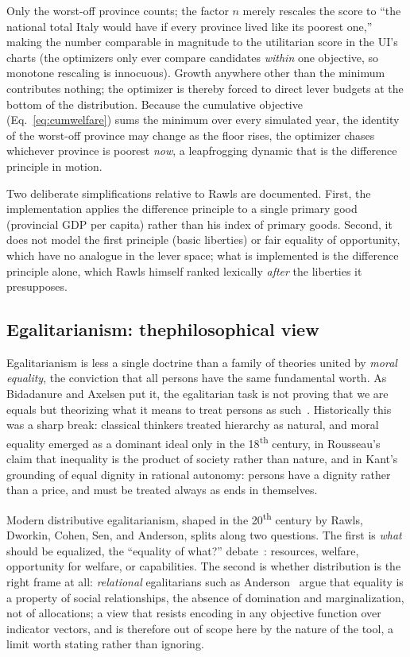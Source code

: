\documentclass[11pt,a4paper]{article}
\begin{document}
Only the worst-off province counts; the factor $n$ merely rescales the score to
``the national total Italy would have if every province lived like its poorest
one,'' making the number comparable in magnitude to the utilitarian score in
the UI's charts (the optimizers only ever compare candidates \emph{within} one
objective, so monotone rescaling is innocuous). Growth anywhere other than the
minimum contributes nothing; the optimizer is thereby forced to direct lever
budgets at the bottom of the distribution. Because the cumulative objective
(Eq.~\ref{eq:cumwelfare}) sums the minimum over every simulated year, the
identity of the worst-off province may change as the floor rises, the
optimizer chases whichever province is poorest \emph{now}, a leapfrogging
dynamic that is the difference principle in motion.

Two deliberate simplifications relative to Rawls are documented. First, the
implementation applies the difference principle to a single primary good
(provincial GDP per capita) rather than his index of primary goods. Second, it
does not model the first principle (basic liberties) or fair equality of
opportunity, which have no analogue in the lever space; what is implemented is
the difference principle alone, which Rawls himself ranked
lexically \emph{after} the liberties it presupposes.

\subsection{Egalitarianism: thephilosophical view}

Egalitarianism is less a single doctrine than a family of theories united by
\emph{moral equality}, the conviction that all persons have the same
fundamental worth. As Bidadanure and Axelsen put it, the egalitarian task is
not proving that we are equals but theorizing what it means to treat persons
as such~\cite{bidadanure2025}. Historically this was a sharp break: classical
thinkers treated hierarchy as natural, and moral equality emerged as a
dominant ideal only in the 18\textsuperscript{th} century, in Rousseau's
claim that inequality is the product of society rather than nature, and in
Kant's grounding of equal dignity in rational autonomy: persons have a dignity
rather than a price, and must be treated always as ends in themselves.

Modern distributive egalitarianism, shaped in the 20\textsuperscript{th}
century by Rawls, Dworkin, Cohen, Sen, and Anderson, splits along two
questions. The first is \emph{what} should be equalized, the ``equality of
what?'' debate~\cite{sen1980}: resources, welfare, opportunity for welfare, or
capabilities. The second is whether distribution is the right frame at all:
\emph{relational} egalitarians such as Anderson~\cite{anderson1999} argue that
equality is a property of social relationships, the absence of domination
and marginalization, not of allocations; a view that resists encoding in
any objective function over indicator vectors, and is therefore out of scope
here by the nature of the tool, a limit worth stating rather than ignoring.
\end{document}
